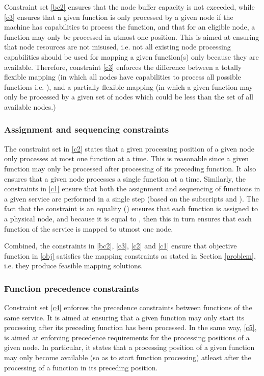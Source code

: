 \documentclass[conference]{IEEEtran}
\begin{document}
Constraint set \eqref{bc2} ensures that the node buffer capacity is not exceeded, while \eqref{c3} ensures that a given function is only processed by a given node if the machine has capabilities to process the function, and that for an eligible node, a function may only be processed in utmost one position. This is aimed at ensuring that node resources are not misused, i.e. not all existing node processing capabilities should be used for mapping a given function(s) only because they are available. Therefore, constraint \eqref{c3} enforces the difference between a totally flexible mapping (in which all nodes have capabilities to process all possible functions i.e. ), and a partially flexible mapping (in which a given function may only be processed by a given set of nodes which could be less than the set of all available nodes.)

\subsubsection{Assignment and sequencing constraints}




The constraint set in \eqref{c2} states that a given processing position of a given node only processes at most one function 
at a time. This is reasonable since a given function may only be processed after processing of its preceding function. It also ensures that a given node processes a single function at a time. Similarly, the constraints in \eqref{c1} ensure that both the assignment and sequencing of functions in a given service are performed in a single step (based on the subscripts  and ). The fact that the constraint is an equality () ensures that each function is assigned to a physical node, and because it is equal to , then this in turn ensures that each function of the service is mapped to utmost one node.

Combined, the constraints in \eqref{bc2}, \eqref{c3}, \eqref{c2} and \eqref{c1} ensure that objective function in \eqref{obj} satisfies the mapping constraints as stated in Section \ref{problem}, i.e. they produce feasible mapping solutions.

\subsubsection{Function precedence constraints}




Constraint set \eqref{c4} enforces the precedence constraints between functions of the same service. It is aimed at ensuring that a given function  may only start its processing after its preceding function  has been processed. In the same way,  \eqref{c5}, is aimed at enforcing precedence requirements for the processing positions of a given node. In particular, it states that a processing position of a given function may only become available (so as to start function processing) atleast after the processing of a function in its preceding position.
\end{document}
